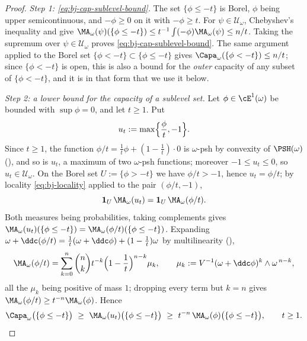 \begin{proof}
\emph{Step 1: \eqref{eq:bj-cap-sublevel-bound}.}  The set
$\{\phi\le-t\}$ is Borel, $\phi$ being upper semicontinuous, and
$-\phi\ge0$ on it with $-\phi\ge t$.  For $\psi\in\mathcal U_\omega$,
Chebyshev's inequality and  give
$\MA_\omega(\psi)(\{\phi\le-t\})\le t^{-1}\int(-\phi)\MA_\omega(\psi)
\le n/t$.  Taking the supremum over $\psi\in\mathcal U_\omega$ proves
\eqref{eq:bj-cap-sublevel-bound}.  The same argument applied to the Borel
set $\{\phi<-t\}\subset\{\phi\le-t\}$ gives
$\Capa_\omega(\{\phi<-t\})\le n/t$; since $\{\phi<-t\}$ is open, this
is also a bound for the \emph{outer} capacity of any subset of
$\{\phi<-t\}$, and it is in that form that we use it below.

\emph{Step 2: a lower bound for the capacity of a sublevel set.}  Let
$\phi\in\cE^1(\omega)$ be bounded with $\sup\phi=0$, and let
$t\ge1$.  Put
\[
 u_t:=\max\Bigl\{\frac\phi t,-1\Bigr\}.
\]
Since $t\ge1$, the function $\phi/t=\tfrac1t\phi+(1-\tfrac1t)\cdot0$ is
$\omega$-psh by convexity of $\PSH(\omega)$
(), and so is $u_t$, a maximum of two
$\omega$-psh functions; moreover $-1\le u_t\le0$, so
$u_t\in\mathcal U_\omega$.  On the Borel set $U:=\{\phi>-t\}$ we have
$\phi/t>-1$, hence $u_t=\phi/t$; by locality
\eqref{eq:bj-locality} applied to the pair $(\phi/t,-1)$,
\[
 \mathbf 1_U\,\MA_\omega(u_t)=\mathbf 1_U\,\MA_\omega(\phi/t).
\]
Both measures being probabilities, taking complements gives
$\MA_\omega(u_t)(\{\phi\le-t\})=\MA_\omega(\phi/t)(\{\phi\le-t\})$.
Expanding
$\omega+\ddc(\phi/t)=\tfrac1t(\omega+\ddc\phi)+(1-\tfrac1t)\omega$ by
multilinearity (),
\[
 \MA_\omega(\phi/t)
 =\sum_{k=0}^n\binom nk t^{-k}\Bigl(1-\frac1t\Bigr)^{n-k}\mu_k,
 \qquad
 \mu_k:=V^{-1}(\omega+\ddc\phi)^k\wedge\omega^{\,n-k},
\]
all the $\mu_k$ being positive of mass $1$; dropping every term but
$k=n$ gives $\MA_\omega(\phi/t)\ge t^{-n}\MA_\omega(\phi)$.  Hence
\[
 \Capa_\omega\bigl(\{\phi\le-t\}\bigr)
 \ \ge\ \MA_\omega(u_t)\bigl(\{\phi\le-t\}\bigr)
 \ \ge\ t^{-n}\,\MA_\omega(\phi)\bigl(\{\phi\le-t\}\bigr),
 \qquad t\ge1 .
\]


\end{proof}

